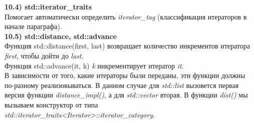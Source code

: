 \documentclass{article}
\begin{document}
\noindent \textbf{10.4) std::iterator\_traits}\\
Помогает автоматически определить \textit{iterator\_tag} (классификация итераторов в начале параграфа).\\
\noindent \textbf{10.5) std::distance, std::advance}\\
Функция {std::distance(first, last)} возвращает количество инкрементов итератора \textit{first}, чтобы дойти до \textit{last}.\\
Функция {std::advance(it, k)} \textit{k} инкрементирует итератор \textit{it}.\\
В зависимости от того, какие итераторы были переданы, эти функции должны по-разному реализовываться.
В данном случае для \textit{std::list} вызовется первая версия функции \textit{distance\_impl()}, а для \textit{std::vector} вторая. В функции \textit{dist()} мы вызываем конструктор от типа\\ \textit{std::iterator\_traits<Iterator>::iterator\_category}.
\end{document}
